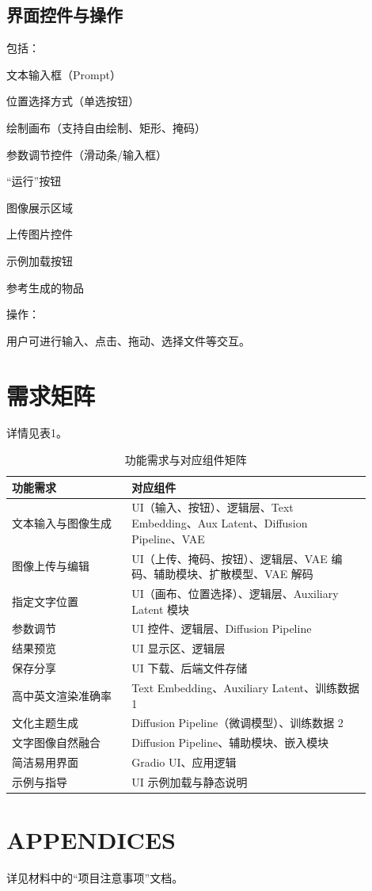 \documentclass[a4paper,12pt]{article}
\begin{document}
\subsection{界面控件与操作}
\noindent 包括：

文本输入框（Prompt）

位置选择方式（单选按钮）

绘制画布（支持自由绘制、矩形、掩码）

参数调节控件（滑动条/输入框）

“运行”按钮

图像展示区域

上传图片控件

示例加载按钮

参考生成的物品

\noindent 操作：

用户可进行输入、点击、拖动、选择文件等交互。
\section{需求矩阵}
详情见表1。
\begin{table}[htbp] %
    \begin{tabular}{|p{0.3\linewidth}|p{0.6\linewidth}|}
        \hline
        \textbf{功能需求} & \textbf{对应组件} \\
        \hline
        文本输入与图像生成 & UI（输入、按钮）、逻辑层、Text Embedding、Aux Latent、Diffusion Pipeline、VAE \\
        \hline
        图像上传与编辑 & UI（上传、掩码、按钮）、逻辑层、VAE 编码、辅助模块、扩散模型、VAE 解码 \\
        \hline
        指定文字位置 & UI（画布、位置选择）、逻辑层、Auxiliary Latent 模块 \\
        \hline
        参数调节 & UI 控件、逻辑层、Diffusion Pipeline \\
        \hline
        结果预览 & UI 显示区、逻辑层 \\
        \hline
        保存分享 & UI 下载、后端文件存储 \\
        \hline
        高中英文渲染准确率 & Text Embedding、Auxiliary Latent、训练数据 1 \\
        \hline
        文化主题生成 & Diffusion Pipeline（微调模型）、训练数据 2 \\
        \hline
        文字图像自然融合 & Diffusion Pipeline、辅助模块、嵌入模块 \\ %
        \hline
        简洁易用界面 & Gradio UI、应用逻辑 \\
        \hline
        示例与指导 & UI 示例加载与静态说明 \\
        \hline
    \end{tabular}
    \centering %
    \caption{功能需求与对应组件矩阵} %
    \label{tab:req_matrix} %
\end{table}

\section{APPENDICES}
详见材料中的“项目注意事项”文档。
\end{document}
